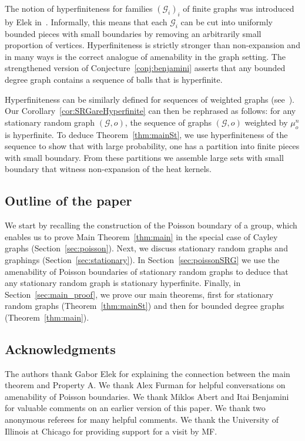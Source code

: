 \documentclass[10pt]{amsart}
\theoremstyle{definition}\newtheorem{defi}[theo]{Definition}\newtheorem{rema}[theo]{Remark}\newtheorem{exam}[theo]{Example}\newtheorem{exem}[theo]{Example}\newtheorem{nota}[theo]{Notation}
\newcommand{\calG}{\mathcal{G}}
\begin{document}
The notion of hyperfiniteness for families $(\calG_i)_i$ of finite graphs was introduced by Elek in~\cite{Elek2006}. Informally, this means that each $\calG_i$ can be cut into uniformly bounded pieces with small boundaries by removing an arbitrarily small proportion of vertices. Hyperfiniteness is strictly stronger than non-expansion and in many ways is the correct analogue of amenability in the graph setting. The strengthened version of Conjecture~\ref{conj:benjamini} asserts that any bounded degree graph contains a sequence of balls that is hyperfinite.


Hyperfiniteness can be similarly defined for sequences of weighted graphs (see~\cite{ElekTimar}). Our Corollary~\ref{cor:SRGareHyperfinite} can then be rephrased as follows: for any stationary random graph $(\calG,o)$, the sequence of graphs $(\calG,o)$ weighted by $\mu_o^n$ is hyperfinite. To deduce Theorem~\ref{thm:mainSt}, we use hyperfiniteness of the sequence to show that with large probability, one has a partition into finite pieces with small boundary. From these partitions we assemble large sets with small boundary that witness non-expansion of the heat kernels.

\subsection{Outline of the paper}

We start by recalling the construction of the Poisson boundary of a group, which enables us to prove Main Theorem~\ref{thm:main} in the special case of Cayley graphs (Section~\ref{sec:poisson}). Next, we discuss stationary random graphs and graphings (Section~\ref{sec:stationary}). In Section~\ref{sec:poissonSRG} we use the amenability of Poisson boundaries of stationary random graphs to deduce that any stationary random graph is stationary hyperfinite. Finally, in Section~\ref{sec:main_proof}, we prove our main theorems, first for stationary random graphs (Theorem~\ref{thm:mainSt}) and then for bounded degree graphs (Theorem~\ref{thm:main}).



\subsection*{Acknowledgments}

The authors thank Gabor Elek for explaining the connection between the main theorem and Property A. We thank Alex Furman for helpful conversations on amenability of Poisson boundaries. We thank Miklos Abert and Itai Benjamini for valuable comments on an earlier version of this paper. We thank two anonymous referees for many helpful comments. We thank the University of Illinois at Chicago for providing support for a visit by MF. 
\end{document}
